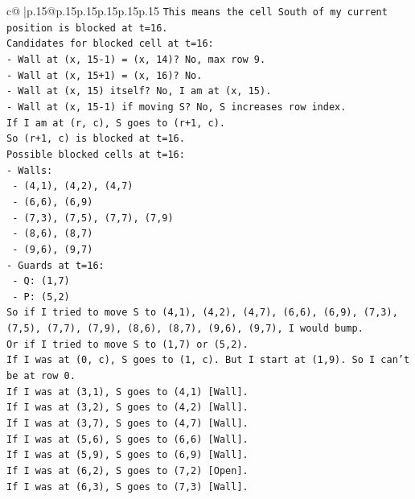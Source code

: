 \documentclass{article}
\begin{document}
{\begin{supertabular}{c@{$\;$}|p{.15\linewidth}@{}p{.15\linewidth}p{.15\linewidth}p{.15\linewidth}p{.15\linewidth}p{.15\linewidth}}
{{{\texttt{This means the cell South of my current position is blocked at t=16.} \\
\texttt{Candidates for blocked cell at t=16:} \\
\texttt{{-} Wall at (x, 15{-}1) = (x, 14)? No, max row 9.} \\
\texttt{{-} Wall at (x, 15+1) = (x, 16)? No.} \\
\texttt{{-} Wall at (x, 15) itself? No, I am at (x, 15).} \\
\texttt{{-} Wall at (x, 15{-}1) if moving S? No, S increases row index.} \\
\texttt{If I am at (r, c), S goes to (r+1, c).} \\
\texttt{So (r+1, c) is blocked at t=16.} \\
\texttt{Possible blocked cells at t=16:} \\
\texttt{{-} Walls:} \\
\texttt{  {-} (4,1), (4,2), (4,7)} \\
\texttt{  {-} (6,6), (6,9)} \\
\texttt{  {-} (7,3), (7,5), (7,7), (7,9)} \\
\texttt{  {-} (8,6), (8,7)} \\
\texttt{  {-} (9,6), (9,7)} \\
\texttt{{-} Guards at t=16:} \\
\texttt{  {-} Q: (1,7)} \\
\texttt{  {-} P: (5,2)} \\
\texttt{So if I tried to move S to (4,1), (4,2), (4,7), (6,6), (6,9), (7,3), (7,5), (7,7), (7,9), (8,6), (8,7), (9,6), (9,7), I would bump.} \\
\texttt{Or if I tried to move S to (1,7) or (5,2).} \\
\texttt{If I was at (0, c), S goes to (1, c). But I start at (1,9). So I can't be at row 0.} \\
\texttt{If I was at (3,1), S goes to (4,1) {[}Wall{]}.} \\
\texttt{If I was at (3,2), S goes to (4,2) {[}Wall{]}.} \\
\texttt{If I was at (3,7), S goes to (4,7) {[}Wall{]}.} \\
\texttt{If I was at (5,6), S goes to (6,6) {[}Wall{]}.} \\
\texttt{If I was at (5,9), S goes to (6,9) {[}Wall{]}.} \\
\texttt{If I was at (6,2), S goes to (7,2) {[}Open{]}.} \\
\texttt{If I was at (6,3), S goes to (7,3) {[}Wall{]}.} \\
}}}
\end{supertabular}}
\end{document}
